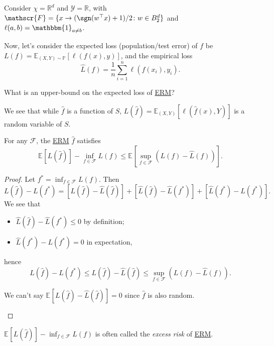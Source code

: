 \begin{eg}
	Consider \(\chi = \mathbb{R} ^d\) and \(\mathscr{Y} = \mathbb{R} \), with \(\mathscr{F} = \{ x \to (\sgn (w^{\top} x ) + 1)/ 2 \colon w\in B_2^d \} \) and \(\ell (a, b) = \mathbbm{1}_{a \neq b} \).
\end{eg}

Now, let's consider the expected loss (population/test error) of \(f\) be \(L(f) = \mathbb{E}_{(X, Y) \sim \mathbb{P} }\left[\ell (f(x), y) \right] \), and the empirical loss
\[
	\hat{L} (f) = \frac{1}{n}\sum_{i=1}^{n} \ell (f(x_i), y_i).
\]

\begin{problem}
What is an upper-bound on the expected loss of \hyperref[prb:ERM]{ERM}?
\end{problem}

We see that while \(\hat{f} \) is a function of \(S\), \(L(\hat{f} ) = \mathbb{E}_{(X, Y)}\left[\ell (\hat{f} (x), Y) \right] \) is a random variable of \(S\).

\begin{lemma}\label{lma:lec6}
	For any \(\mathscr{F} \), the \hyperref[prb:ERM]{ERM} \(\hat{f} \) satisfies
	\[
		\mathbb{E}_{}[L(\hat{f} ) ] - \inf _{f\in \mathscr{F} } L(f)
		\leq \mathbb{E}_{}\left[\sup _{f\in \mathscr{F} } (L(f) - \hat{L} (f) )\right] .
	\]
\end{lemma}
\begin{proof}
	Let \(f^{\ast} = \inf _{f\in \mathscr{F} } L(f)\). Then
	\[
		L(\hat{f} ) - L(f^{\ast} )
		= [L(\hat{f} ) - \hat{L} (\hat{f} )] + [\hat{L} (\hat{f} ) - \hat{L} (f^{\ast} )] + [\hat{L} (f^{\ast} ) - L(f^{\ast} )].
	\]
	We see that
	\begin{itemize}
		\item \(\hat{L} (\hat{f} ) - \hat{L} (f^{\ast} ) \leq 0\) by definition;
		\item \(\hat{L} (f^{\ast} ) - L(f^{\ast} ) = 0\) in expectation,
	\end{itemize}
	hence
	\[
		L(\hat{f} ) - L(f^{\ast} )
		\leq L(\hat{f} ) - \hat{L} (\hat{f} )
		\leq \sup _{f\in \mathscr{F} } (L(f) - \hat{L} (f)).
	\]

	\begin{note}
		We can't say \(\mathbb{E}_{}[L(\hat{f} ) - \hat{L} (\hat{f} ) ] = 0\) since \(\hat{f} \) is also random.
	\end{note}


\end{proof}

\begin{notation}
	\(\mathbb{E}_{}\left[L(\hat{f} ) \right] - \inf _{f\in \mathscr{F} } L(f)\) is often called the \emph{excess risk} of \hyperref[prb:ERM]{ERM}.
\end{notation}

